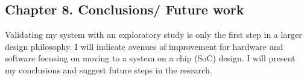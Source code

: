 \subsection{Chapter 8. Conclusions/ Future work}
\label{subsec:Chapter8Conclusions}
Validating my system with an exploratory study is only the first step in a larger design philosophy. I will indicate avenues of improvement for hardware and software focusing on moving to a system on a chip (SoC) design. I will present my conclusions and suggest future steps in the research.

\fi
